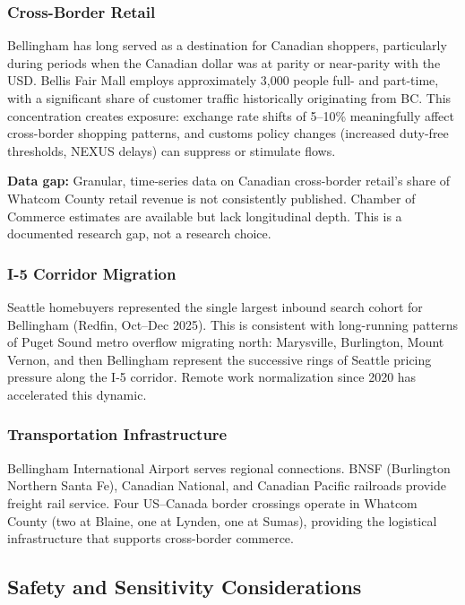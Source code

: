 \documentclass[11pt,letterpaper]{article}
\begin{document}
\subsubsection{Cross-Border Retail}

Bellingham has long served as a destination for Canadian shoppers, particularly during periods when the Canadian dollar was at parity or near-parity with the USD. Bellis Fair Mall employs approximately 3,000 people full- and part-time, with a significant share of customer traffic historically originating from BC. This concentration creates exposure: exchange rate shifts of 5--10\% meaningfully affect cross-border shopping patterns, and customs policy changes (increased duty-free thresholds, NEXUS delays) can suppress or stimulate flows.

\textbf{Data gap:} Granular, time-series data on Canadian cross-border retail's share of Whatcom County retail revenue is not consistently published. Chamber of Commerce estimates are available but lack longitudinal depth. This is a documented research gap, not a research choice.

\subsubsection{I-5 Corridor Migration}

Seattle homebuyers represented the single largest inbound search cohort for Bellingham (Redfin, Oct--Dec 2025). This is consistent with long-running patterns of Puget Sound metro overflow migrating north: Marysville, Burlington, Mount Vernon, and then Bellingham represent the successive rings of Seattle pricing pressure along the I-5 corridor. Remote work normalization since 2020 has accelerated this dynamic.

\subsubsection{Transportation Infrastructure}

Bellingham International Airport serves regional connections. BNSF (Burlington Northern Santa Fe), Canadian National, and Canadian Pacific railroads provide freight rail service. Four US--Canada border crossings operate in Whatcom County (two at Blaine, one at Lynden, one at Sumas), providing the logistical infrastructure that supports cross-border commerce.

\subsection{Safety and Sensitivity Considerations}
\end{document}
